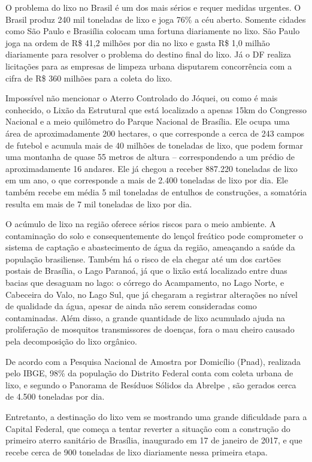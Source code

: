 O problema do lixo no Brasil é um dos mais sérios e requer medidas urgentes. O Brasil produz 240 mil toneladas de lixo e joga 76\% a céu aberto. Somente cidades como São Paulo e Brasiília colocam uma fortuna diariamente no lixo. São Paulo joga na ordem de R\$ 41,2 milhões por dia no lixo e gasta R\$ 1,0 milhão diariamente para resolver o problema do destino final do lixo. Já o DF realiza licitações para as empresas de limpeza urbana disputarem concorrência com a cifra de R\$ 360 milhões para a coleta do lixo.

Impossível não mencionar o Aterro Controlado do Jóquei, ou como é mais conhecido, o Lixão da Estrutural que está localizado a apenas 15km do Congresso Nacional e a meio quilômetro do Parque Nacional de Brasília. Ele ocupa uma área de aproximadamente 200 hectares, o que corresponde a cerca de 243 campos de futebol e acumula mais de 40 milhões de toneladas de lixo, que podem formar uma montanha de quase 55 metros de altura – correspondendo a um prédio de aproximadamente 16 andares. Ele já chegou a receber 887.220 toneladas de lixo em um ano, o que corresponde a mais de 2.400 toneladas de lixo por dia. Ele também recebe em média 5 mil toneladas de entulhos de construções, a somatória resulta em mais de 7 mil toneladas de lixo por dia.

O acúmulo de lixo na região oferece sérios riscos para o meio ambiente. A contaminação do solo e consequentemente do lençol freático pode comprometer o sistema de captação e abastecimento de água da região, ameaçando a saúde da população brasiliense. Também há o risco de ela chegar até um dos cartões postais de Brasília, o Lago Paranoá, já que o lixão está localizado entre duas bacias que desaguam no lago: o córrego do Acampamento, no Lago Norte, e Cabeceira do Valo, no Lago Sul, que já chegaram a registrar alterações no nível de qualidade da água, apesar de ainda não serem consideradas como contaminadas. Além disso, a grande quantidade de lixo acumulado ajuda na proliferação de mosquitos transmissores de doenças, fora o mau cheiro causado pela decomposição do lixo orgânico.

De acordo com a Pesquisa Nacional de Amostra por Domicílio (Pnad), realizada pelo IBGE, 98\% da população do Distrito Federal conta com coleta urbana de lixo, e segundo o Panorama de Resíduos Sólidos da Abrelpe , são gerados cerca de 4.500 toneladas por dia.

Entretanto, a destinação do lixo vem se mostrando uma grande dificuldade para a Capital Federal, que começa a tentar reverter a situação com a construção do primeiro aterro sanitário de Brasília, inaugurado em 17 de janeiro de 2017, e que recebe cerca de 900 toneladas de lixo diariamente nessa primeira etapa.

